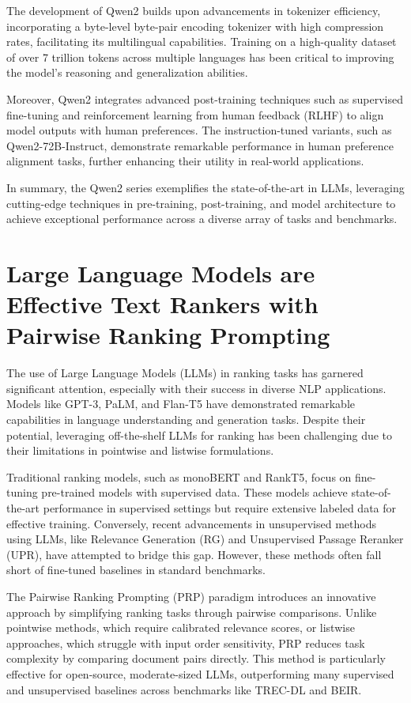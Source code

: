 The development of Qwen2 builds upon advancements in tokenizer efficiency, incorporating a byte-level byte-pair encoding tokenizer with high compression rates, facilitating its multilingual capabilities. Training on a high-quality dataset of over 7 trillion tokens across multiple languages has been critical to improving the model's reasoning and generalization abilities.

Moreover, Qwen2 integrates advanced post-training techniques such as supervised fine-tuning and reinforcement learning from human feedback (RLHF) to align model outputs with human preferences. The instruction-tuned variants, such as Qwen2-72B-Instruct, demonstrate remarkable performance in human preference alignment tasks, further enhancing their utility in real-world applications.

In summary, the Qwen2 series exemplifies the state-of-the-art in LLMs, leveraging cutting-edge techniques in pre-training, post-training, and model architecture to achieve exceptional performance across a diverse array of tasks and benchmarks.

\section*{Large Language Models are Effective Text Rankers with Pairwise Ranking Prompting}
The use of Large Language Models (LLMs) in ranking tasks has garnered significant attention, especially with their success in diverse NLP applications. Models like GPT-3, PaLM, and Flan-T5 have demonstrated remarkable capabilities in language understanding and generation tasks. Despite their potential, leveraging off-the-shelf LLMs for ranking has been challenging due to their limitations in pointwise and listwise formulations.

Traditional ranking models, such as monoBERT and RankT5, focus on fine-tuning pre-trained models with supervised data. These models achieve state-of-the-art performance in supervised settings but require extensive labeled data for effective training. Conversely, recent advancements in unsupervised methods using LLMs, like Relevance Generation (RG) and Unsupervised Passage Reranker (UPR), have attempted to bridge this gap. However, these methods often fall short of fine-tuned baselines in standard benchmarks.

The Pairwise Ranking Prompting (PRP) paradigm introduces an innovative approach by simplifying ranking tasks through pairwise comparisons. Unlike pointwise methods, which require calibrated relevance scores, or listwise approaches, which struggle with input order sensitivity, PRP reduces task complexity by comparing document pairs directly. This method is particularly effective for open-source, moderate-sized LLMs, outperforming many supervised and unsupervised baselines across benchmarks like TREC-DL and BEIR.

